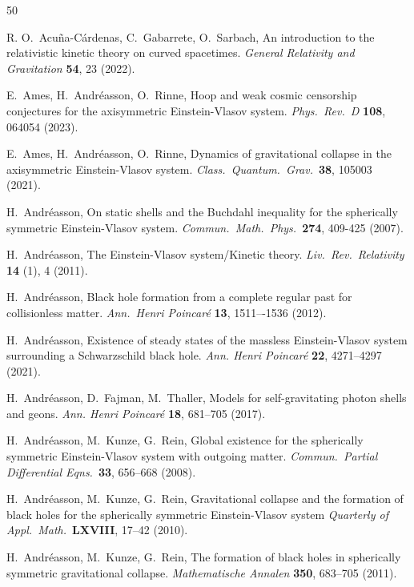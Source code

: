 \documentclass[11pt]{article}
\begin{document}
\begin{thebibliography}{50}

  {\sc R. O.~Acu\~{n}a-C\'{a}rdenas, C.~Gabarrete, O.~Sarbach}, 
  An introduction to the relativistic kinetic theory on curved spacetimes. 
  {\em General Relativity and Gravitation} {\bf 54}, 23 (2022).

  {\sc E.~Ames, H.~Andr\'{e}asson, O.~Rinne}, 
  Hoop and weak cosmic censorship conjectures for
  the axisymmetric Einstein-Vlasov system. 
  {\em Phys.\ Rev.\ D }{\bf 108}, 064054 (2023).

  {\sc E.~Ames, H.~Andr\'{e}asson, O.~Rinne},  
  Dynamics of gravitational collapse in the axisymmetric
  Einstein-Vlasov system. 
  {\em Class.\ Quantum.\ Grav.}\ {\bf 38}, 105003 (2021).

  {\sc H.~Andr\'{e}asson},
  On static shells and the Buchdahl inequality for
  the spherically symmetric Einstein-Vlasov system.
  {\em Commun.\ Math.\ Phys.}\ {\bf 274}, 409-425 (2007).

  {\sc H.~Andr\'{e}asson},
  The Einstein-Vlasov system/Kinetic theory. 
  {\em Liv.\ Rev.\ Relativity } 
  {\bf 14} (1), 4 (2011).

  {\sc H.~Andr\'{e}asson},
  Black hole formation from a complete regular past for collisionless matter. 
  {\em Ann.\ Henri Poincar\'{e}} {\bf 13}, 1511–-1536 (2012).

  {\sc H.~Andr\'{e}asson,} 
  Existence of steady states of the massless Einstein-Vlasov
  system surrounding a Schwarzschild black hole. 
  {\em Ann. Henri Poincar\'{e}} {\bf 22}, 4271--4297 (2021).

  {\sc H.~Andr\'{e}asson, D.~Fajman, M.~Thaller},  
  Models for self-gravitating photon shells and geons. 
  {\em Ann. Henri Poincar\'{e}} {\bf 18}, 681--705 (2017).

  {\sc H.~Andr\'{e}asson, M.~Kunze, G.~Rein},
  Global existence for the spherically symmetric Einstein-Vlasov 
  system with outgoing matter. 
  {\em Commun.\ Partial Differential Eqns.}\ 
  {\bf 33}, 656--668 (2008).

  {\sc H.~Andr\'{e}asson, M.~Kunze, G.~Rein},
  Gravitational collapse and the formation of black holes 
  for the spherically symmetric Einstein-Vlasov system
  {\em Quarterly of Appl.\ Math.}\
  {\bf LXVIII}, 17--42 (2010).

  {\sc H.~Andr\'{e}asson, M.~Kunze, G.~Rein},
  The formation of black holes in spherically symmetric gravitational collapse.
  {\em Mathematische Annalen} {\bf 350}, 683--705 (2011).


\end{thebibliography}
\end{document}
